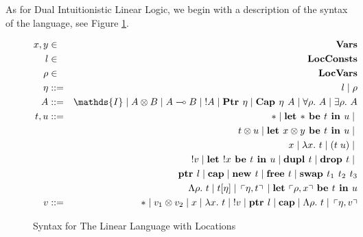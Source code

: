 \documentclass[]{unswthesis}
\newcommand{\Forall}[1]{\forall #1 \ldotp \,}
\newcommand{\Exists}[1]{\exists #1 \ldotp \,}
\newcommand{\lam}[1]{\lambda #1 \ldotp \,}
\newcommand{\Lam}[1]{\Lambda #1 \ldotp \,}
\newcommand{\app}[2]{(#1 \; #2)}
\newcommand{\lolly}{\multimap}
\newcommand{\letbe}[3]{\textbf{let $#1$ be $#2$ in $#3$}}
\newcommand{\sor}{\; | \;}
\newcommand{\Ptr}[1]{\textbf{Ptr $#1$}}
\newcommand{\ptr}[1]{\textbf{ptr $#1$}}
\newcommand{\Capa}[2]{\textbf{Cap $#1$ $#2$}}
\newcommand{\capa}{\textbf{cap}}
\newcommand{\lquine}{\left\ulcorner}
\newcommand{\rquine}{\right\urcorner}
\newcommand{\dupl}[1]{\textbf{dupl $#1$}}
\newcommand{\drop}[1]{\textbf{drop $#1$}}
\newcommand{\lnew}[1]{\textbf{new $#1$}}
\newcommand{\lfree}[1]{\textbf{free $#1$}}
\newcommand{\lswap}[3]{\textbf{swap $#1$ $#2$ $#3$}}
\newcommand{\qpair}[2]{\lquine #1, #2 \rquine}
\let\b\textbf
\begin{document}

As for Dual Intuitionistic Linear Logic, we begin with a description of the syntax of the language, see Figure \ref{l3_syntax}.

\begin{figure}[h]
\caption{Syntax for The Linear Language with Locations}
\label{l3_syntax}
\begin{eqnarray*}
x,y & \in & \b{Vars} \\
l & \in & \b{LocConsts} \\
\rho & \in & \b{LocVars} \\
\eta & ::= & l \sor \rho \\
A & ::= & \mathds{I} \sor A \otimes B \sor A \lolly B \sor !A \sor \Ptr{\eta} \sor \Capa{\eta}{A} \sor
\Forall{\rho} A \sor \Exists{\rho} A \\
t,u & ::= & * \sor \letbe{*}{t}{u} \sor \\
  && t \otimes u \sor \letbe{x \otimes y}{t}{u} \sor \\
  && x \sor \lam{x} t \sor \app{t}{u} \sor \\
  && {!v} \sor \letbe{!x}{t}{u} \sor \dupl{t} \sor \drop{t} \sor \\
  && \ptr{l} \sor \capa \sor \lnew{t} \sor \lfree{t} \sor \lswap{t_1}{t_2}{t_3} \\
  && \Lam{\rho} t \sor t [\eta] \sor \qpair{\eta}{t} \sor \letbe{\qpair{\rho}{x}}{t}{u} \\
v & ::= & * \sor v_1 \otimes v_2 \sor x \sor \lam{x} t \sor {!v} \sor \ptr{l} \sor \capa
  \sor \Lam{\rho} t \sor \qpair{\eta}{v}
\end{eqnarray*}
\end{figure}
\end{document}
